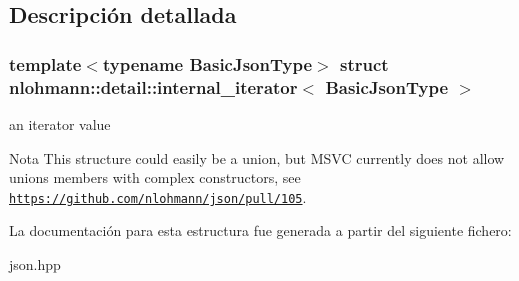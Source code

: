 \subsection{Descripción detallada}
\subsubsection*{template$<$typename Basic\+Json\+Type$>$\newline
struct nlohmann\+::detail\+::internal\+\_\+iterator$<$ Basic\+Json\+Type $>$}

an iterator value 

\begin{DoxyNote}{Nota}
This structure could easily be a union, but M\+S\+VC currently does not allow unions members with complex constructors, see \href{https://github.com/nlohmann/json/pull/105}{\tt https\+://github.\+com/nlohmann/json/pull/105}. 
\end{DoxyNote}


La documentación para esta estructura fue generada a partir del siguiente fichero\+:\begin{DoxyCompactItemize}
\item 
json.\+hpp\end{DoxyCompactItemize}
